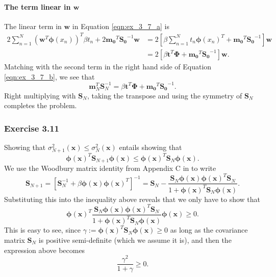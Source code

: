 \documentclass[12pt, a4paper]{article}
\newcommand{\vect}[1]{\bm{#1}}
\begin{document}
\paragraph{The term linear in $\vect{w}$}
The linear term in $\vect{w}$ in Equation \eqref{eqn:ex_3_7_a} is
\begin{align*}
		2 \sum_{n=1}^{N} (\vect{w}^T \vect{\phi}(x_n))^T \beta t_n
		+
		2 \vect{m_0}^T \vect{S_0}^{-1} \vect{w}
		&=
		2 \left[ 
		\beta \sum_{n=1}^{N}  t_n \vect{\phi}(x_n)^T + \vect{m_0}^T \vect{S_0}^{-1}
		 \right] \vect{w} \\
		&=
		2 \left[ 
		\beta \vect{t}^T \vect{\Phi} + \vect{m_0}^T \vect{S_0}^{-1}
		\right] \vect{w}.
\end{align*}
Matching with the second term in the right hand side of Equation \eqref{eqn:ex_3_7_b}, we see that
\begin{equation*}
	\vect{m}_N^T \vect{S}_N^{-1} = \beta \vect{t}^T \vect{\Phi} + \vect{m_0}^T \vect{S_0}^{-1}.
\end{equation*}
Right multiplying with $\vect{S}_N$, taking the transpose and using the symmetry of $\vect{S}_N$ completes the problem.


\subsubsection*{Exercise 3.11}
Showing that $\sigma^2_{N+1} (\vect{x}) \leq \sigma^2_{N} (\vect{x})$ entails showing that
\begin{equation*}
	\vect{\phi}( \vect{x} )^T \vect{S}_{N + 1} \vect{\phi}( \vect{x} )
	\leq 
	\vect{\phi}( \vect{x} )^T \vect{S}_{N } \vect{\phi}( \vect{x} ).
\end{equation*}
We use the Woodbury matrix identity from Appendix C in \cite{bishop_pattern_2011} to write
\begin{equation*}
	\vect{S}_{N + 1}
	=
	\left[ \vect{S}_{N}^{-1} + \beta \vect{\phi}(\vect{x}) \vect{\phi}( \vect{x} )^T   \right]^{-1}
	=
	\vect{S}_N
	-
	\frac{
		\vect{S}_N\vect{\phi}(\vect{x}) \vect{\phi}(\vect{x})^T   \vect{S}_N
		}{
		1 + \vect{\phi}(\vect{x})^T \vect{S}_N \vect{\phi}(\vect{x})
		}.
\end{equation*}
Substituting this into the inequality above reveals that we only have to show that
\begin{equation*}
	\vect{\phi}( \vect{x} )^T
		\frac{
			\vect{S}_N\vect{\phi}(\vect{x}) \vect{\phi}(\vect{x})^T   \vect{S}_N
		}{
		1 + \vect{\phi}(\vect{x})^T \vect{S}_N \vect{\phi}(\vect{x})
	}
	 \vect{\phi}( \vect{x} ) \geq 0 .
\end{equation*}
This is easy to see, since $\gamma := \vect{\phi}(\vect{x})^T \vect{S}_N \vect{\phi}(\vect{x}) \geq 0$ as long as the covariance matrix $\vect{S}_N$ is positive semi-definite (which we assume it is), and then the expression above becomes
\begin{equation*}
	\frac{\gamma^2}{1 + \gamma} \geq 0.
\end{equation*}
\end{document}
